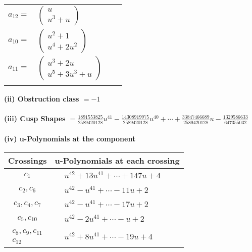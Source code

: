 \documentclass[1p]{elsarticle_modified}
\theoremstyle{definition}
\begin{document}
\begin{tabular}{m{7pt} m{180pt} m{7pt} m{180pt} }
\flushright $a_{12}=$&$\begin{pmatrix}u\\u^3+u\end{pmatrix}$ \\
\flushright $a_{10}=$&$\begin{pmatrix}u^2+1\\u^4+2 u^2\end{pmatrix}$ \\
\flushright $a_{11}=$&$\begin{pmatrix}u^3+2 u\\u^5+3 u^3+u\end{pmatrix}$\\&\end{tabular}
\flushleft \textbf{(ii) Obstruction class $= -1$}\\~\\
\flushleft \textbf{(iii) Cusp Shapes $= \frac{1891553825}{2589420128} u^{41}-\frac{14308919975}{2589420128} u^{40}+\cdots+\frac{33847466689}{2589420128} u-\frac{1329586633}{647355032}$}\\~\\
\newpage\renewcommand{\arraystretch}{1}
\flushleft \textbf{(iv) u-Polynomials at the component}\newline \\
\begin{tabular}{m{50pt}|m{274pt}}
Crossings & \hspace{64pt}u-Polynomials at each crossing \\
\hline $$\begin{aligned}c_{1}\end{aligned}$$&$\begin{aligned}
&u^{42}+13 u^{41}+\cdots+147 u+4
\end{aligned}$\\
\hline $$\begin{aligned}c_{2},c_{6}\end{aligned}$$&$\begin{aligned}
&u^{42}- u^{41}+\cdots-11 u+2
\end{aligned}$\\
\hline $$\begin{aligned}c_{3},c_{4},c_{7}\end{aligned}$$&$\begin{aligned}
&u^{42}- u^{41}+\cdots-17 u+2
\end{aligned}$\\
\hline $$\begin{aligned}c_{5},c_{10}\end{aligned}$$&$\begin{aligned}
&u^{42}-2 u^{41}+\cdots- u+2
\end{aligned}$\\
\hline $$\begin{aligned}c_{8},c_{9},c_{11}\\c_{12}\end{aligned}$$&$\begin{aligned}
&u^{42}+8 u^{41}+\cdots-19 u+4
\end{aligned}$\\
\hline
\end{tabular}\\~\\
\end{document}
